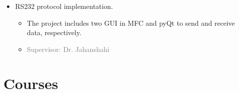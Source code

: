 \begin{itemize}
		\item RS232 protocol implementation.
		\begin{itemize}
			\item The project includes two GUI in MFC and pyQt to send and receive data, respectively. 
			\item \textcolor{gray}{Supervisor: Dr. Jahanshahi}
		\end{itemize}
	
	
	\end{itemize}



\section{Courses}

